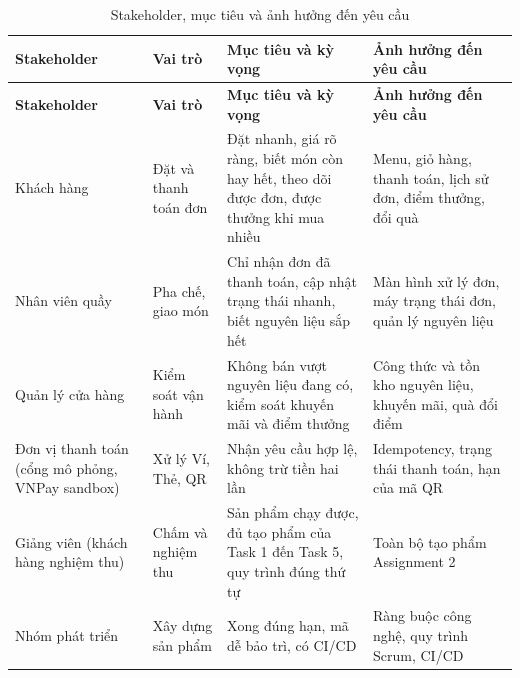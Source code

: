 {\small
\begin{longtable}{@{}L{2.6cm}L{2.4cm}L{4.6cm}L{4.3cm}@{}}
\caption{Stakeholder, mục tiêu và ảnh hưởng đến yêu cầu}\label{tab:stakeholder}\\
\toprule
\textbf{Stakeholder} & \textbf{Vai trò} & \textbf{Mục tiêu và kỳ vọng} & \textbf{Ảnh hưởng đến yêu cầu} \\ \midrule \endfirsthead
\toprule \textbf{Stakeholder} & \textbf{Vai trò} & \textbf{Mục tiêu và kỳ vọng} & \textbf{Ảnh hưởng đến yêu cầu} \\ \midrule \endhead
\bottomrule \endfoot
Khách hàng & Đặt và thanh toán đơn & Đặt nhanh, giá rõ ràng, biết món còn hay hết, theo dõi được đơn, được thưởng khi mua nhiều & Menu, giỏ hàng, thanh toán, lịch sử đơn, điểm thưởng, đổi quà \\
Nhân viên quầy & Pha chế, giao món & Chỉ nhận đơn đã thanh toán, cập nhật trạng thái nhanh, biết nguyên liệu sắp hết & Màn hình xử lý đơn, máy trạng thái đơn, quản lý nguyên liệu \\
Quản lý cửa hàng & Kiểm soát vận hành & Không bán vượt nguyên liệu đang có, kiểm soát khuyến mãi và điểm thưởng & Công thức và tồn kho nguyên liệu, khuyến mãi, quà đổi điểm \\
Đơn vị thanh toán (cổng mô phỏng, VNPay sandbox) & Xử lý Ví, Thẻ, QR & Nhận yêu cầu hợp lệ, không trừ tiền hai lần & Idempotency, trạng thái thanh toán, hạn của mã QR \\
Giảng viên (khách hàng nghiệm thu) & Chấm và nghiệm thu & Sản phẩm chạy được, đủ tạo phẩm của Task 1 đến Task 5, quy trình đúng thứ tự & Toàn bộ tạo phẩm Assignment 2 \\
Nhóm phát triển & Xây dựng sản phẩm & Xong đúng hạn, mã dễ bảo trì, có CI/CD & Ràng buộc công nghệ, quy trình Scrum, CI/CD \\
\end{longtable}
}